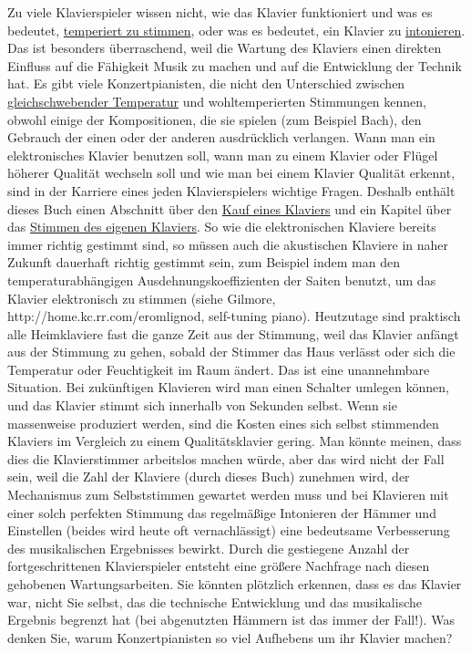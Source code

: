Zu viele Klavierspieler wissen nicht, wie das Klavier funktioniert und was es bedeutet, \hyperlink{c2_2c}{temperiert zu stimmen}, oder was es bedeutet, ein Klavier zu \hyperlink{c2_7_hamm}{intonieren}.
 Das ist besonders überraschend, weil die Wartung des Klaviers einen direkten Einfluss auf die Fähigkeit Musik zu machen und auf die Entwicklung der Technik hat.
 Es gibt viele Konzertpianisten, die nicht den Unterschied zwischen \hyperlink{et1}{gleichschwebender Temperatur} und wohltemperierten Stimmungen kennen, obwohl einige der Kompositionen, die sie spielen (zum Beispiel Bach), den Gebrauch der einen oder der anderen ausdrücklich verlangen.
 Wann man ein elektronisches Klavier benutzen soll, wann man zu einem Klavier oder Flügel höherer Qualität wechseln soll und wie man bei einem Klavier Qualität erkennt, sind in der Karriere eines jeden Klavierspielers wichtige Fragen.
 Deshalb enthält dieses Buch einen Abschnitt über den \hyperlink{c1iii17e}{Kauf eines Klaviers} und ein Kapitel über das \hyperlink{c2_1}{Stimmen des eigenen Klaviers}.
 So wie die elektronischen Klaviere bereits immer richtig gestimmt sind, so müssen auch die akustischen Klaviere in naher Zukunft dauerhaft richtig gestimmt sein, zum Beispiel indem man den temperaturabhängigen Ausdehnungskoeffizienten der Saiten benutzt, um das Klavier elektronisch zu stimmen (siehe Gilmore, http://home.kc.rr.com/eromlignod, self-tuning piano).
 Heutzutage sind praktisch alle Heimklaviere fast die ganze Zeit aus der Stimmung, weil das Klavier anfängt aus der Stimmung zu gehen, sobald der Stimmer das Haus verlässt oder sich die Temperatur oder Feuchtigkeit im Raum ändert.
 Das ist eine unannehmbare Situation.
 Bei zukünftigen Klavieren wird man einen Schalter umlegen können, und das Klavier stimmt sich innerhalb von Sekunden selbst.
 Wenn sie massenweise produziert werden, sind die Kosten eines sich selbst stimmenden Klaviers im Vergleich zu einem Qualitätsklavier gering.
 Man könnte meinen, dass dies die Klavierstimmer arbeitslos machen würde, aber das wird nicht der Fall sein, weil die Zahl der Klaviere (durch dieses Buch) zunehmen wird, der Mechanismus zum Selbststimmen gewartet werden muss und bei Klavieren mit einer solch perfekten Stimmung das regelmäßige Intonieren der Hämmer und Einstellen (beides wird heute oft vernachlässigt) eine bedeutsame Verbesserung des musikalischen Ergebnisses bewirkt.
 Durch die gestiegene Anzahl der fortgeschrittenen Klavierspieler entsteht eine größere Nachfrage nach diesen gehobenen Wartungsarbeiten.
 Sie könnten plötzlich erkennen, dass es das Klavier war, nicht Sie selbst, das die technische Entwicklung und das musikalische Ergebnis begrenzt hat (bei abgenutzten Hämmern ist das immer der Fall!).
 Was denken Sie, warum Konzertpianisten so viel Aufhebens um ihr Klavier machen?
 

